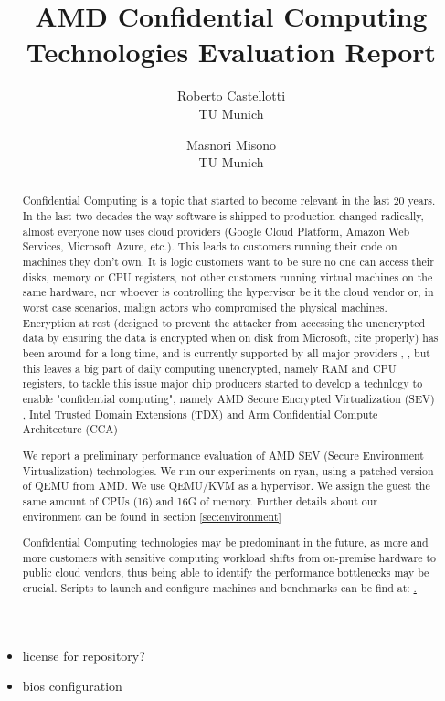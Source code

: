 \documentclass[twocolumn]{article}
\begin{document}
\date{}
\title{\Large \bf AMD Confidential Computing Technologies Evaluation Report}
\author{{\rm Roberto Castellotti}\\TU Munich \and {\rm Masnori Misono}\\TU Munich}
\maketitle

\begin{itemize}
    \item license for repository?
    \item bios configuration
\end{itemize}

\begin{abstract}
    Confidential Computing is a topic that started to become relevant in the last 20 years. In the last two decades the way software is shipped to production changed radically, almost everyone now uses cloud providers (Google Cloud Platform, Amazon Web Services, Microsoft Azure, etc.). This leads to customers running their code on machines they don't own. It is logic customers want to be sure no one can access their disks, memory or CPU registers, not other customers running virtual machines on the same hardware, nor whoever is controlling the hypervisor be it  the cloud vendor  or, in worst case scenarios, malign actors who compromised the physical machines. Encryption at rest (designed to prevent the attacker from accessing the unencrypted data by ensuring the data is encrypted when on disk from Microsoft, cite properly) has been around for a long time, and is currently supported by all major providers \cite{aws-enc}, \cite{gcp-enc}, \cite{azure-enc} but this leaves a big part of daily computing unencrypted, namely RAM and CPU registers, to tackle this issue major chip producers started to develop a technlogy to enable "confidential computing", 
    namely AMD Secure Encrypted Virtualization (SEV) \cite{memory-encryption}, Intel Trusted Domain Extensions (TDX) \cite{tdx} and Arm Confidential Compute Architecture (CCA) \cite{cca}

    We report a preliminary performance evaluation of AMD SEV (Secure Environment Virtualization) technologies.
    We run our experiments on ryan, using a patched version of QEMU from AMD. We use QEMU/KVM as a hypervisor. We assign the guest the same amount of CPUs (16) and 16G of memory. Further details about our environment can be found in section \ref{sec:environment}
    
    Confidential Computing technologies may be predominant in the future, as more and more customers with sensitive computing workload shifts from on-premise hardware to public cloud vendors, thus being able to identify the performance bottlenecks may be crucial. Scripts to launch and configure machines and benchmarks can be find at: \href{https://github.com/rcastellotti/gr}.  


\end{abstract}
\end{document}
